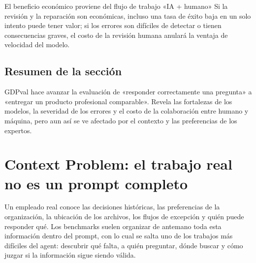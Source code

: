 \documentclass[a4paper]{article}
\begin{document}
\begin{importantbox}{El beneficio económico proviene del flujo de trabajo «IA + humano»}
Si la revisión y la reparación son económicas, incluso una tasa de éxito baja en un solo intento puede tener valor; si los errores son difíciles de detectar o tienen consecuencias graves, el costo de la revisión humana anulará la ventaja de velocidad del modelo.
\end{importantbox}


\subsection{Resumen de la sección}

GDPval hace avanzar la evaluación de «responder correctamente una pregunta» a «entregar un producto profesional comparable». Revela las fortalezas de los modelos, la severidad de los errores y el costo de la colaboración entre humano y máquina, pero aun así se ve afectado por el contexto y las preferencias de los expertos.

\section{Context Problem: el trabajo real no es un prompt completo}



Un empleado real conoce las decisiones históricas, las preferencias de la organización, la ubicación de los archivos, los flujos de excepción y quién puede responder qué. Los benchmarks suelen organizar de antemano toda esta información dentro del prompt, con lo cual se salta uno de los trabajos más difíciles del agent: descubrir qué falta, a quién preguntar, dónde buscar y cómo juzgar si la información sigue siendo válida.
\end{document}
